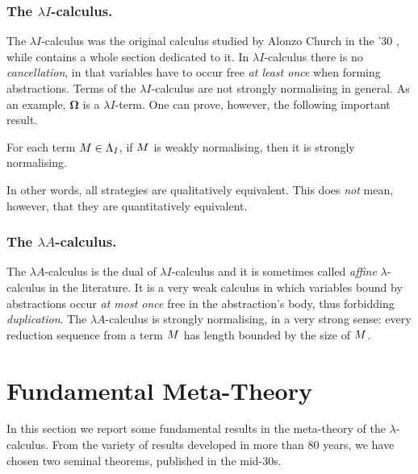 \subsubsection{The $\lambda I$-calculus.}
The $\lambda I$-calculus was the original calculus studied by Alonzo
Church in the '30 \cite{church_unsolvable_1936}, while
\cite{barendregt_lambda_1984} contains a whole section dedicated to
it. In $\lambda I$-calculus there is no \emph{cancellation}, in that
variables have to occur free \emph{at least once} when forming
abstractions. Terms of the $\lambda I$-calculus are not strongly
normalising in general. As an example, $\bm{\Omega}$ is a $\lambda I$-term.
One can prove, however, the following important result.
\begin{theorem}
	For each term $M\in\Lambda_I$, if $M$ is weakly normalising, then it is strongly normalising.
\end{theorem}
In other words, all strategies are qualitatively equivalent. This does \emph{not} mean, however, that they are quantitatively equivalent.
\subsubsection{The $\lambda A$-calculus.}
The $\lambda A$-calculus is the dual of $\lambda I$-calculus and it is
sometimes called \emph{affine} $\lambda$-calculus in the
literature. It is a very weak calculus in which variables bound by
abstractions occur \emph{at most once} free in the abstraction's body,
thus forbidding \emph{duplication}. The $\lambda A$-calculus is strongly
normalising, in a very strong sense: every reduction sequence from a term
$M$ has length bounded by the size of $M$.
\section{Fundamental Meta-Theory}
In this section we report some fundamental results in the meta-theory of the $\lambda$-calculus. From the variety of results developed in more than 80 years, we have chosen two seminal theorems, published in the mid-30s.
